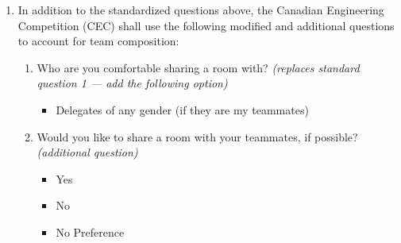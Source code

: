 \begin{enumerate}
 \item
  In addition to the standardized questions above, the Canadian Engineering Competition (CEC) shall use the following modified and additional questions to account for team composition:

  \begin{enumerate}
   \item
    Who are you comfortable sharing a room with? \emph{(replaces standard question 1 — add the following option)}
    \begin{itemize}
     \item Delegates of any gender (if they are my teammates)
    \end{itemize}

   \item
    Would you like to share a room with your teammates, if possible? \emph{(additional question)}
    \begin{itemize}
     \item Yes
     \item No
     \item No Preference
    \end{itemize}

  \end{enumerate}
\end{enumerate}
